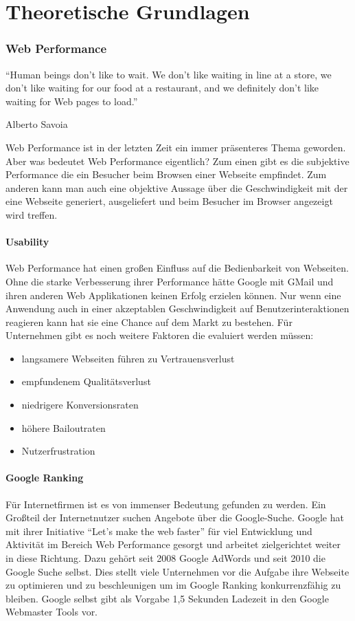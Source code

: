 \part{Theoretische Grundlagen}
\label{sec:theory}

\section{Web Performance}
\epigraph{``Human beings don’t like to wait. We don’t like waiting in line at a store, we don’t like waiting for our food at a restaurant, and we definitely don’t like waiting for Web pages to load.''}{Alberto Savoia}

Web Performance ist in der letzten Zeit ein immer präsenteres Thema geworden. Aber was bedeutet Web Performance eigentlich? Zum einen gibt es die subjektive Performance die ein Besucher beim Browsen einer Webseite empfindet. Zum anderen kann man auch eine objektive Aussage über die Geschwindigkeit mit der eine Webseite generiert, ausgeliefert und beim Besucher im Browser angezeigt wird treffen.
\subsection{Usability}
Web Performance hat einen großen Einfluss auf die Bedienbarkeit von Webseiten. Ohne die starke Verbesserung ihrer Performance hätte Google mit GMail und ihren anderen Web Applikationen keinen Erfolg erzielen können. Nur wenn eine Anwendung auch in einer akzeptablen Geschwindigkeit auf Benutzerinteraktionen reagieren kann hat sie eine Chance auf dem Markt zu bestehen.
Für Unternehmen gibt es noch weitere Faktoren die evaluiert werden müssen:
\begin{itemize}
 \item langsamere Webseiten führen zu Vertrauensverlust
 \item empfundenem Qualitätsverlust
 \item niedrigere Konversionsraten
 \item höhere Bailoutraten
 \item Nutzerfrustration
\end{itemize}


\subsection{Google Ranking}
Für Internetfirmen ist es von immenser Bedeutung gefunden zu werden. Ein Großteil der Internetnutzer suchen Angebote über die Google-Suche. Google hat mit ihrer Initiative ``Let's make the web faster'' für viel Entwicklung und Aktivität im Bereich Web Performance gesorgt und arbeitet zielgerichtet weiter in diese Richtung. Dazu gehört seit  2008 Google AdWords und seit 2010 die Google Suche selbst. Dies stellt viele Unternehmen vor die Aufgabe ihre Webseite zu optimieren und zu beschleunigen um im Google Ranking konkurrenzfähig zu bleiben. Google selbst gibt als Vorgabe 1,5 Sekunden Ladezeit in den Google Webmaster Tools vor.

